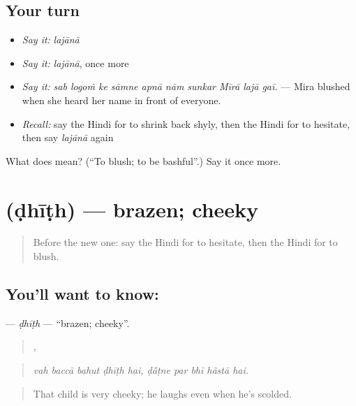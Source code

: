 \subsection*{Your turn}
\begin{itemize}
\raggedright
  \item \emph{Say it:} \emph{lajānā}
  \item \emph{Say it:} \emph{lajānā}, once more
  \item \emph{Say it:} \emph{sab logoṁ ke sāmne apnā nām sunkar Mīrā lajā gaī.} — Mira blushed when she heard her name in front of everyone.
  \item \emph{Recall:} say the Hindi for to shrink back shyly, then the Hindi for to hesitate, then say \emph{lajānā} again
\end{itemize}

\begin{tcolorbox}[breakable,colback=teal!4,colframe=teal!35!black,title={Before you move on}]
What does  mean? (\textquotedblleft{}To blush; to be bashful\textquotedblright{}.) Say it once more.
\end{tcolorbox}
\section[\texorpdfstring{\hi{ढीठ} (ḍhīṭh)}{ढीठ (ḍhīṭh)}]{ (ḍhīṭh) — brazen; cheeky}

\label{lesson:HI-C461-dhith}



\begin{quote}
Before the new one: say the Hindi for to hesitate, then the Hindi for to blush.
\end{quote}

\subsection*{You'll want to know: }
\textbf{} — \emph{ḍhīṭh} — \textquotedblleft{}brazen; cheeky\textquotedblright{}.

\begin{quote}
    ,     
\end{quote}

\begin{quote}
\emph{vah baccā bahut ḍhīṭh hai, ḍā̃ṭne par bhī hãstā hai.}
\end{quote}

\begin{quote}
That child is very cheeky; he laughs even when he's scolded.
\end{quote}

